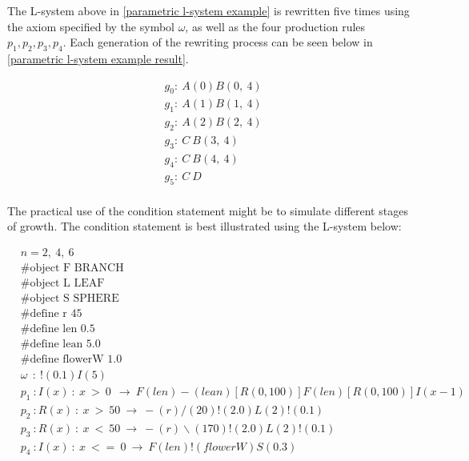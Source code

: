 \noindent
The L-system above in \ref{parametric l-system example} is rewritten five times using the axiom specified by the symbol $\omega$, as well as the four production rules $p_1, p_2, p_3, p_4$. Each generation of the rewriting process can be seen below in \ref{parametric l-system example result}.

\begin{equation} \label{parametric l-system example result}
\begin{aligned}
	&g_0 :~ A(0)B(0,~4)\\
	&g_1 :~ A(1)B(1,~4)\\
	&g_2 :~ A(2)B(2,~4)\\
	&g_3 :~ C~B(3,~4)\\
	&g_4 :~ C~B(4,~4)\\
	&g_5 :~ C~D\\
\end{aligned}
\end{equation}

\noindent
The practical use of the condition statement might be to simulate different stages of growth. The condition statement is best illustrated using the L-system below: 

\begin{equation} \label{conditional l-system example}
\begin{aligned}
	&n=2,~4,~6 \\
	&\#\text{object F BRANCH} \\
 	&\#\text{object L LEAF} \\
	&\#\text{object S SPHERE} \\
	&\#\text{define r 45} \\
	&\#\text{define len 0.5} \\
	&\#\text{define lean 5.0} \\
	&\#\text{define flowerW 1.0} \\
	&\omega~~ :~ !(0.1)I(5)\\
	&p_1~ :  I(x)~ :~ x~ >~ 0~~ \rightarrow~ F(len)-(lean)[R({0, 100})]F(len)[R({0, 100})]I(x-1)\\
	&p_2~ :  R(x)~ :~ x~ >~ 50~ \rightarrow~ -(r)/(20)!(2.0)L(2)!(0.1)\\
	&p_3~ :  R(x)~ :~ x~ <~ 50~ \rightarrow~ -(r)\backslash(170)!(2.0)L(2)!(0.1)\\
	&p_4~ :  I(x)~ :~ x~ <=~ 0~ \rightarrow~ F(len)!(flowerW)S(0.3)\\
\end{aligned}
\end{equation}

